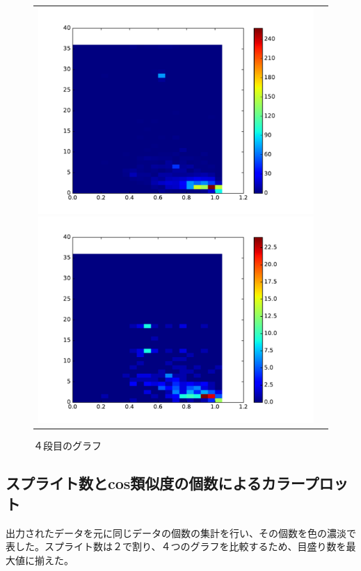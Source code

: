 \documentclass[a4paper,10pt,onecolumn,oneside,openany]{jsbook}
\begin{document}
\begin{figure}[h]
\begin{tabular}{cc}
 	\begin{minipage}[t]{0.45\hsize}
	 \centering
	 \includegraphics[keepaspectratio, scale = 0.35]{colormap_block_3.pdf}
	 \caption{３段目のグラフ}
	 \label{third_block}
	\end{minipage}
        \begin{minipage}[t]{0.45\hsize}
	 \centering
	 \includegraphics[keepaspectratio, scale = 0.35]{colormap_block_4.pdf}
	 \caption{４段目のグラフ}
	 \label{fourth_block}
	\end{minipage}
 \end{tabular}
 \end{figure}
  
\newpage
 \subsection{スプライト数とcos類似度の個数によるカラープロット}
出力されたデータを元に同じデータの個数の集計を行い、その個数を色の濃淡で表した。スプライト数は２で割り、４つのグラフを比較するため、目盛り数を最大値に揃えた。 
 
\end{document}
